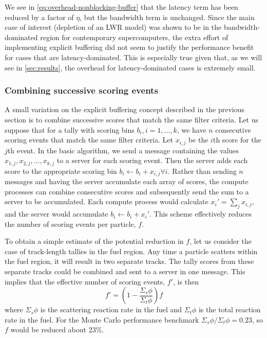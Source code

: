 \documentclass[3p,fleqn]{elsarticle}
\begin{document}
\noindent We see in \eqref{eq:overhead-nonblocking-buffer} that the latency term
has been reduced by a factor of $\eta$, but the bandwidth term is
unchanged. Since the main case of interest (depletion of an LWR model) was shown
to be in the bandwidth-dominated region for contemporary supercomputers, the
extra effort of implementing explicit buffering did not seem to justify the
performance benefit for cases that are latency-dominated. This is especially
true given that, as we will see in \autoref{sec:results}, the overhead for
latency-dominated cases is extremely small.

\subsubsection{Combining successive scoring events}

A small variation on the explicit buffering concept described in the previous
section is to combine successive scores that match the same filter criteria. Let
us suppose that for a tally with scoring bins $b_i, i = 1, \dots, k$, we have
$n$ consecutive scoring events that match the same filter criteria. Let
$x_{i,j}$ be the $i$th score for the $j$th event. In the basic algorithm, we
send a message containing the values $x_{1,j}, x_{2,j}, \dots, x_{k,j}$ to a
server for each scoring event. Then the server adds each score to the
appropriate scoring bin $b_i \gets b_i + x_{i,j} \forall i$. Rather than sending
$n$ messages and having the server accumulate each array of scores, the compute
processes can combine consecutive scores and subsequently send the sum to a
server to be accumulated. Each compute process would calculate $x_i' = \sum_j
x_{i,j}$, and the server would accumulate $b_i \gets b_i + x_i'$. This scheme
effectively reduces the number of scoring events per particle, $f$.

To obtain a simple estimate of the potential reduction in $f$, let us consider
the case of track-length tallies in the fuel region. Any time a particle
scatters within the fuel region, it will result in two separate tracks. The
tally scores from these separate tracks could be combined and sent to a server
in one message. This implies that the effective number of scoring events, $f'$,
is then
\begin{equation}
  f' = \left ( 1 - \frac{\Sigma_s \phi}{\Sigma_t \phi} \right ) f
\end{equation}
where $\Sigma_s \phi$ is the scattering reaction rate in the fuel and $\Sigma_t
\phi$ is the total reaction rate in the fuel. For the Monte Carlo performance
benchmark $\Sigma_s \phi/\Sigma_t \phi = 0.23$, so $f$ would be reduced about
23\%.
\end{document}
